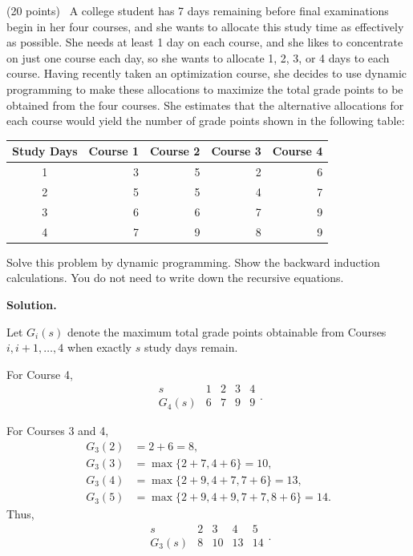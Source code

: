 \documentclass[11pt,letterpaper]{article}
\newenvironment{examquestion}[2]{%
  \clearpage
  \begin{list}{}{%
    \setlength{\leftmargin}{2.15em}%
    \setlength{\labelwidth}{1.55em}%
    \setlength{\labelsep}{0.60em}%
    \setlength{\itemindent}{0pt}%
    \setlength{\listparindent}{0pt}%
    \setlength{\parsep}{0.42em}%
    \setlength{\topsep}{0pt}%
  }
  \item[\hfill #1.] (#2 points)\ 
}{%
  \end{list}
}
\newenvironment{solution}{%
  \par\medskip
  \color{red}
  \noindent\textbf{Solution.}\par
}{%
  \par
  \color{black}
}
\begin{document}
\begin{examquestion}{3}{20}
A college student has 7 days remaining before final examinations begin in her four
courses, and she wants to allocate this study time as effectively as possible. She
needs at least 1 day on each course, and she likes to concentrate on just one course
each day, so she wants to allocate 1, 2, 3, or 4 days to each course. Having recently
taken an optimization course, she decides to use dynamic programming to make these
allocations to maximize the total grade points to be obtained from the four courses.
She estimates that the alternative allocations for each course would yield the number
of grade points shown in the following table:

\begin{center}
\begin{tabular}{c|rrrr}
\toprule
Study Days&Course 1&Course 2&Course 3&Course 4\\
\midrule
1&3&5&2&6\\
2&5&5&4&7\\
3&6&6&7&9\\
4&7&9&8&9\\
\bottomrule
\end{tabular}
\end{center}

Solve this problem by dynamic programming. Show the backward induction calculations.
You do not need to write down the recursive equations.

\begin{solution}
\begingroup
\setlength{\abovedisplayskip}{7pt plus 2pt minus 2pt}
\setlength{\belowdisplayskip}{7pt plus 2pt minus 2pt}
\setlength{\abovedisplayshortskip}{4pt plus 2pt}
\setlength{\belowdisplayshortskip}{4pt plus 2pt}
Let $G_i(s)$ denote the maximum total grade points obtainable from Courses
$i,i+1,\ldots,4$ when exactly $s$ study days remain.

For Course 4,
\[
\begin{array}{c|rrrr}
s&1&2&3&4\\ \hline
G_4(s)&6&7&9&9
\end{array}.
\]

For Courses 3 and 4,
\[
\begin{aligned}
G_3(2)&=2+6=8,\\
G_3(3)&=\max\{2+7,4+6\}=10,\\
G_3(4)&=\max\{2+9,4+7,7+6\}=13,\\
G_3(5)&=\max\{2+9,4+9,7+7,8+6\}=14.
\end{aligned}
\]
Thus,
\[
\begin{array}{c|rrrr}
s&2&3&4&5\\ \hline
G_3(s)&8&10&13&14
\end{array}.
\]


\end{solution}
\end{examquestion}
\end{document}

